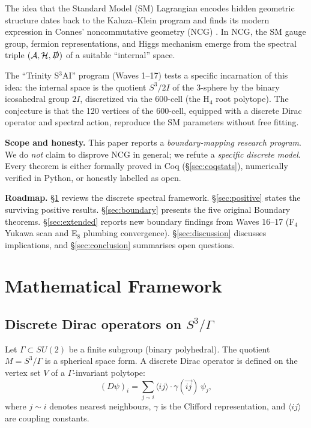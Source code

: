 \documentclass[11pt,a4paper]{article}
\theoremstyle{definition}
\newcommand{\Dirac}{\slashed{D}}
\begin{document}
The idea that the Standard Model (SM) Lagrangian encodes hidden geometric
structure dates back to the Kaluza--Klein program and finds its modern
expression in Connes' noncommutative geometry (NCG)
\cite{Connes:1996,ConnesMarcolli:2008}. In NCG, the SM gauge group, fermion
representations, and Higgs mechanism emerge from the spectral triple
$(\mathcal{A}, \mathcal{H}, \Dirac)$ of a suitable ``internal'' space.

The ``Trinity S$^3$AI'' program (Waves 1--17) tests a specific incarnation
of this idea: the internal space is the quotient $S^3/2I$ of the 3-sphere by
the binary icosahedral group $2I$, discretized via the 600-cell (the
H$_4$ root polytope). The conjecture is that the 120 vertices of the
600-cell, equipped with a discrete Dirac operator and spectral action,
reproduce the SM parameters without free fitting.

\textbf{Scope and honesty.} This paper reports a \emph{boundary-mapping research program}. We do \emph{not} claim to disprove NCG in general; we refute a
\emph{specific discrete model}. Every theorem is either formally proved in
Coq (\S\ref{sec:coqstats}), numerically verified in Python, or honestly
labelled as open.

\textbf{Roadmap.} \S\ref{sec:framework} reviews the discrete spectral
framework. \S\ref{sec:positive} states the surviving positive results.
\S\ref{sec:boundary} presents the five original Boundary theorems.
\S\ref{sec:extended} reports new boundary findings from Waves 16--17
(F$_4$ Yukawa scan and E$_8$ plumbing convergence).
\S\ref{sec:discussion} discusses implications, and
\S\ref{sec:conclusion} summarises open questions.

\section{Mathematical Framework}\label{sec:framework}

\subsection{Discrete Dirac operators on $S^3/\Gamma$}

Let $\Gamma \subset SU(2)$ be a finite subgroup (binary polyhedral). The
quotient $M = S^3/\Gamma$ is a spherical space form. A discrete Dirac
operator is defined on the vertex set $V$ of a $\Gamma$-invariant polytope:
\begin{equation}\label{eq:dirac}
  (D\psi)_i = \sum_{j \sim i} \langle i j \rangle \cdot \gamma(\overrightarrow{ij}) \, \psi_j,
\end{equation}
where $j \sim i$ denotes nearest neighbours, $\gamma$ is the Clifford
representation, and $\langle i j \rangle$ are coupling constants.
\end{document}
